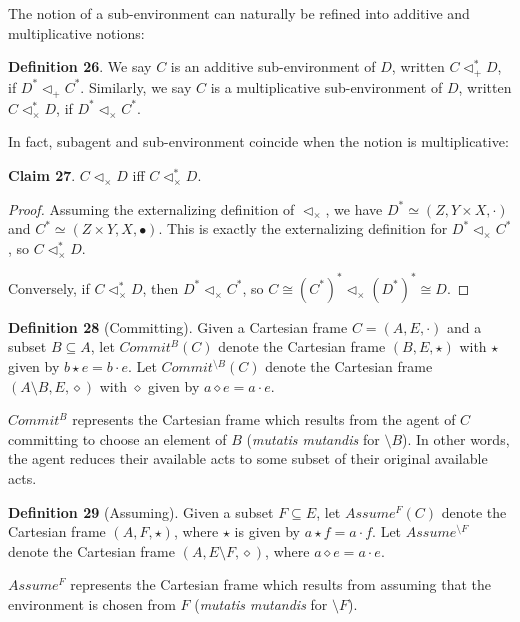 \documentclass{article}
\begin{document}
\bigskip
\noindent The notion of a sub-environment can naturally be refined into additive and multiplicative notions:

\bigskip
\noindent \textbf{Definition 26}.
We say $C$ is an additive sub-environment of $D$, written $C \triangleleft^*_{+} D$, if $D^* \triangleleft_+ C^*$.
Similarly, we say $C$ is a multiplicative sub-environment of $D$, written $C \triangleleft^*_{\times} D$, if $D^* \triangleleft_{\times} C^*$.

\bigskip
\noindent In fact, subagent and sub-environment coincide when the notion is multiplicative:

\bigskip
\noindent \textbf{Claim 27}.
$C \triangleleft_{\times} D$ iff $C \triangleleft^*_{\times} D$.

\begin{proof}
Assuming the externalizing definition of $\triangleleft_{\times}$, we have $D^* \simeq (Z, Y \times X, \cdot)$ and $C^* \simeq (Z \times Y, X, \bullet)$.
This is exactly the externalizing definition for $D^* \triangleleft_{\times} C^*$, so $C \triangleleft^*_{\times} D$.

Conversely, if $C \triangleleft^*_{\times} D$, then $D^* \triangleleft_{\times} C^*$, so $C \cong (C^*)^* \triangleleft_{\times} (D^*)^* \cong D$.
\end{proof}

\bigskip
\noindent \textbf{Definition 28} (Committing).
Given a Cartesian frame $C = (A, E, \cdot)$ and a subset $B \subseteq A$, let $Commit^B (C)$ denote the Cartesian frame $(B, E, \star)$ with $\star$ given by $b \star e = b \cdot e$.
Let $Commit^{\setminus B} (C)$ denote the Cartesian frame $(A \setminus B, E, \diamond)$ with $\diamond$ given by $a \diamond e = a \cdot e$.

\bigskip
\noindent $Commit^B$ represents the Cartesian frame which results from the agent of $C$ committing to choose an element of $B$ (\emph{mutatis mutandis} for $\setminus B$).
In other words, the agent reduces their available acts to some subset of their original available acts.

\bigskip
\noindent \textbf{Definition 29} (Assuming).
Given a subset $F \subseteq E$, let $Assume^F (C)$ denote the Cartesian frame $(A, F, \star)$, where $\star$ is given by $a \star f = a \cdot f$. Let $Assume^{\setminus F}$ denote the Cartesian frame $(A, E \setminus F, \diamond)$, where $a \diamond e = a \cdot e$.

\bigskip
\noindent $Assume^F$ represents the Cartesian frame which results from assuming that the environment is chosen from $F$ (\emph{mutatis mutandis} for $\setminus F$).
\end{document}
